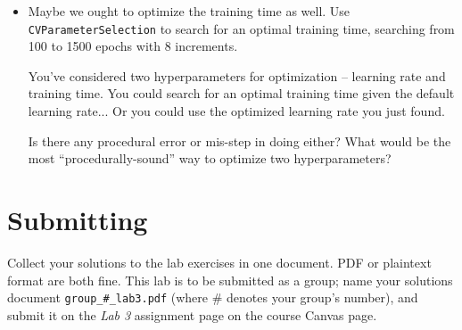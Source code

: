 \documentclass[11pt]{cselabheader}
\begin{document}
\begin{itemize}[leftmargin=*]
  \item Maybe we ought to optimize the training time as well. Use \texttt{CVParameterSelection} to search for an optimal training time, searching from 100 to 1500 epochs with 8 increments.

  \begin{ex}
    You've considered two hyperparameters for optimization -- learning rate and training time. You could search for an optimal training time given the default learning rate... Or you could use the optimized learning rate you just found.

    Is there any procedural error or mis-step in doing either? What would be the most ``procedurally-sound'' way to optimize two hyperparameters?
  \end{ex}


\end{itemize}

\pagebreak

\section{Submitting}

Collect your solutions to the lab exercises in one document. PDF or plaintext format are both fine. This lab is to be submitted as a group; name your solutions document \texttt{group\_\#\_lab3.pdf} (where \# denotes your group's number), and submit it on the \textit{Lab 3} assignment page on the course Canvas page.
\end{document}

